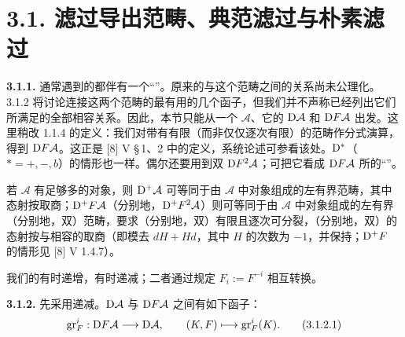 \section*{3.1. 滤过导出范畴、典范滤过与朴素滤过}

\par\medskip\noindent\textbf{3.1.1.}
通常遇到的都伴有一个“”。原来的与这个范畴之间的关系尚未公理化。3.1.2 将讨论连接这两个范畴的最有用的几个函子，但我们并不声称已经列出它们所满足的全部相容关系。因此，本节只能从一个 $\mathcal A$、它的 $\mathrm{D}\mathcal A$ 和 $\mathrm{D} F\mathcal A$ 出发。这里稍改 1.1.4 的定义：我们对带有有限（而非仅仅逐次有限）的范畴作分式演算，得到 $\mathrm{D} F\mathcal A$。这正是 [8] V \S\,1、2 中的定义，系统论述可参看该处。$\mathrm{D}^*$（$*=+,-,b$）的情形也一样。偶尔还要用到双 $\mathrm{D} F^2\mathcal A$；可把它看成 $\mathrm{D} F\mathcal A$ 所的“”。

若 $\mathcal A$ 有足够多的对象，则 $\mathrm{D}^+\mathcal A$ 可等同于由 $\mathcal A$ 中对象组成的左有界范畴，其中态射按取商；$\mathrm{D}^+F\mathcal A$（分别地，$\mathrm{D}^+F^2\mathcal A$）则可等同于由 $\mathcal A$ 中对象组成的左有界（分别地，双）范畴，要求（分别地，双）有限且逐次可分裂，（分别地，双）的态射按与相容的取商（即模去 $dH+Hd$，其中 $H$ 的次数为 $-1$，并保持；$\mathrm{D}^+F$ 的情形见 [8] V 1.4.7）。

我们的有时递增，有时递减；二者通过规定 $F_i:=F^{-i}$ 相互转换。

\par\medskip\noindent\textbf{3.1.2.}
先采用递减。$\mathrm{D}\mathcal A$ 与 $\mathrm{D} F\mathcal A$ 之间有如下函子：
\begin{equation*}
\operatorname{gr}_F^i:\mathrm{D} F\mathcal A\longrightarrow\mathrm{D}\mathcal A,
\qquad (K,F)\longmapsto\operatorname{gr}_F^i(K).
\tag{3.1.2.1}
\end{equation*}

